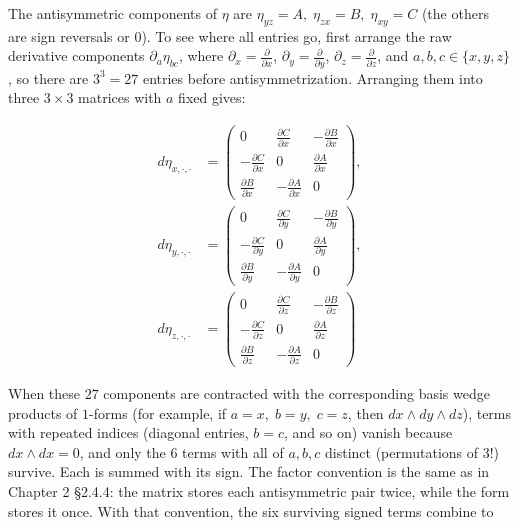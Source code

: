 The antisymmetric components of \(\eta\) are
\(\eta_{yz}=A,\; \eta_{zx}=B,\; \eta_{xy}=C\) (the others are sign
reversals or \(0\)). To see where all entries go, first arrange the raw
derivative components \(\partial_a\eta_{bc}\), where
\(\partial_x=\frac{\partial}{\partial x}\),
\(\partial_y=\frac{\partial}{\partial y}\),
\(\partial_z=\frac{\partial}{\partial z}\), and \(a,b,c\in\{x,y,z\}\),
so there are \(3^3=27\) entries before antisymmetrization. Arranging
them into three \(3 \times 3\) matrices with \(a\) fixed gives:

\[
\begin{aligned}
d\eta_{x,\cdot,\cdot}
&= \begin{pmatrix}
0 & \frac{\partial C}{\partial x} & -\frac{\partial B}{\partial x} \\
-\frac{\partial C}{\partial x} & 0 & \frac{\partial A}{\partial x} \\
\frac{\partial B}{\partial x} & -\frac{\partial A}{\partial x} & 0
\end{pmatrix}, \\
d\eta_{y,\cdot,\cdot}
&= \begin{pmatrix}
0 & \frac{\partial C}{\partial y} & -\frac{\partial B}{\partial y} \\
-\frac{\partial C}{\partial y} & 0 & \frac{\partial A}{\partial y} \\
\frac{\partial B}{\partial y} & -\frac{\partial A}{\partial y} & 0
\end{pmatrix}, \\
d\eta_{z,\cdot,\cdot}
&= \begin{pmatrix}
0 & \frac{\partial C}{\partial z} & -\frac{\partial B}{\partial z} \\
-\frac{\partial C}{\partial z} & 0 & \frac{\partial A}{\partial z} \\
\frac{\partial B}{\partial z} & -\frac{\partial A}{\partial z} & 0
\end{pmatrix}
\end{aligned}
\]

When these \(27\) components are contracted with the corresponding basis
wedge products of \(1\)-forms (for example, if \(a=x,\;b=y,\;c=z\), then
\(dx \wedge dy \wedge dz\)), terms with repeated indices (diagonal
entries, \(b=c\), and so on) vanish because \(dx \wedge dx = 0\), and
only the \(6\) terms with all of \(a,b,c\) distinct (permutations of
\(3!\)) survive. Each is summed with its sign. The factor convention is
the same as in Chapter 2 §2.4.4: the matrix stores each antisymmetric
pair twice, while the form stores it once. With that convention, the six
surviving signed terms combine to

